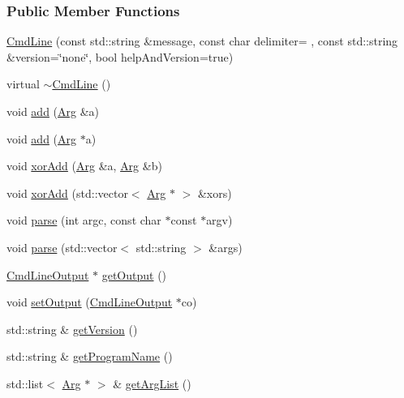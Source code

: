 \subsubsection*{Public Member Functions}
\begin{DoxyCompactItemize}
\item 
\hyperlink{classTCLAP_1_1CmdLine_a2e62a3493f8700afb49a7deb872a5b96}{Cmd\+Line} (const std\+::string \&message, const char delimiter= \textquotesingle{} \textquotesingle{}, const std\+::string \&version=\char`\"{}none\char`\"{}, bool help\+And\+Version=true)
\item 
virtual \hyperlink{classTCLAP_1_1CmdLine_a8a7bddba32c3d96e2a01e4c8e160e6fa}{$\sim$\+Cmd\+Line} ()
\item 
void \hyperlink{classTCLAP_1_1CmdLine_a94c511d4735ad9b8c97edaa3827f8bbf}{add} (\hyperlink{classTCLAP_1_1Arg}{Arg} \&a)
\item 
void \hyperlink{classTCLAP_1_1CmdLine_ab8a08e8f4d3ca7709c85416f76e805a3}{add} (\hyperlink{classTCLAP_1_1Arg}{Arg} $\ast$a)
\item 
void \hyperlink{classTCLAP_1_1CmdLine_afbaa2071d0c3276b383089acabdc0dd2}{xor\+Add} (\hyperlink{classTCLAP_1_1Arg}{Arg} \&a, \hyperlink{classTCLAP_1_1Arg}{Arg} \&b)
\item 
void \hyperlink{classTCLAP_1_1CmdLine_ac7f2d7ee32a5157f625ad9833ab148cf}{xor\+Add} (std\+::vector$<$ \hyperlink{classTCLAP_1_1Arg}{Arg} $\ast$ $>$ \&xors)
\item 
void \hyperlink{classTCLAP_1_1CmdLine_acb07daf5a1370c176a7b4a6e4119fe6e}{parse} (int argc, const char $\ast$const $\ast$argv)
\item 
void \hyperlink{classTCLAP_1_1CmdLine_a712c3edf86aa0a8a28fb0b6d504d945a}{parse} (std\+::vector$<$ std\+::string $>$ \&args)
\item 
\hyperlink{classTCLAP_1_1CmdLineOutput}{Cmd\+Line\+Output} $\ast$ \hyperlink{classTCLAP_1_1CmdLine_ad8aea2617edf53bbc20c8964ee5476e6}{get\+Output} ()
\item 
void \hyperlink{classTCLAP_1_1CmdLine_a4506e305cd10437c7ce5a5ba34cfed0f}{set\+Output} (\hyperlink{classTCLAP_1_1CmdLineOutput}{Cmd\+Line\+Output} $\ast$co)
\item 
std\+::string \& \hyperlink{classTCLAP_1_1CmdLine_a85b5653d1a5b48fe6accead64615cf33}{get\+Version} ()
\item 
std\+::string \& \hyperlink{classTCLAP_1_1CmdLine_a47a6d496980ee11ffc42e27144a61797}{get\+Program\+Name} ()
\item 
std\+::list$<$ \hyperlink{classTCLAP_1_1Arg}{Arg} $\ast$ $>$ \& \hyperlink{classTCLAP_1_1CmdLine_a3c281da929a281fb883ea47632b7ad38}{get\+Arg\+List} ()

\end{DoxyCompactItemize}
